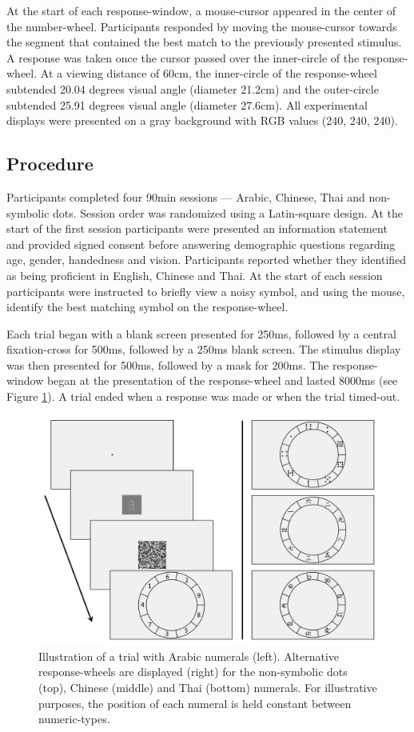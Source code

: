 At the start of each response-window, a mouse-cursor appeared in the center of the number-wheel. Participants responded by moving the mouse-cursor towards the segment that contained the best match to the previously presented stimulus. A response was taken once the cursor passed over the inner-circle of the response-wheel. At a viewing distance of 60cm, the inner-circle of the response-wheel subtended 20.04 degrees visual angle (diameter 21.2cm) and the outer-circle subtended 25.91 degrees visual angle (diameter 27.6cm). All experimental displays were presented on a gray background with RGB values (240, 240, 240). 

\subsection{Procedure}
Participants completed four 90min sessions --- Arabic, Chinese, Thai and non-symbolic dots. Session order was randomized using a Latin-square design. At the start of the first session participants were presented an information statement and provided signed consent before answering demographic questions regarding age, gender, handedness and vision. Participants reported whether they identified as being proficient in English, Chinese and Thai. At the start of each session participants were instructed to briefly view a noisy symbol, and using the mouse, identify the best matching symbol on the response-wheel.

Each trial began with a blank screen presented for 250ms, followed by a central fixation-cross for 500ms, followed by a 250ms blank screen. The stimulus display was then presented for 500ms, followed by a mask for 200ms. The response-window began at the presentation of the response-wheel and lasted 8000ms (see Figure \ref{fig:Wheel_SlideOrder}). A trial ended when a response was made or when the trial timed-out. 

\begin{figure}[tbh]
\centering \includegraphics[scale = .37]{Figures/Wheel/TrialOrderSlide.pdf}
\caption{Illustration of a trial with Arabic numerals (left). Alternative response-wheels are displayed (right) for the non-symbolic dots (top), Chinese (middle) and Thai (bottom) numerals. For illustrative purposes, the position of each numeral is held constant between numeric-types.}
\label{fig:Wheel_SlideOrder}
\end{figure}

